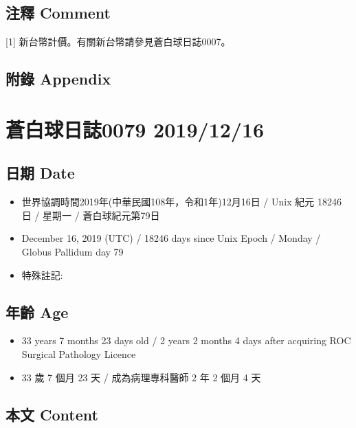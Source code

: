 \documentclass[
]{article}
\providecommand{\tightlist}{%
  \setlength{\itemsep}{0pt}\setlength{\parskip}{0pt}}
\begin{document}
\hypertarget{ux6ce8ux91cb-comment-13}{%
\subsection{注釋 Comment}\label{ux6ce8ux91cb-comment-13}}

{[}1{]} 新台幣計價。有關新台幣請參見蒼白球日誌0007。

\hypertarget{ux9644ux9304-appendix-14}{%
\subsection{附錄 Appendix}\label{ux9644ux9304-appendix-14}}

\hypertarget{ux84bcux767dux7403ux65e5ux8a8c0079-20191216}{%
\section{蒼白球日誌0079
2019/12/16}\label{ux84bcux767dux7403ux65e5ux8a8c0079-20191216}}

\hypertarget{ux65e5ux671f-date-15}{%
\subsection{日期 Date}\label{ux65e5ux671f-date-15}}

\begin{itemize}
\tightlist
\item
  世界協調時間2019年(中華民國108年，令和1年)12月16日 / Unix 紀元 18246
  日 / 星期一 / 蒼白球紀元第79日
\item
  December 16, 2019 (UTC) / 18246 days since Unix Epoch / Monday /
  Globus Pallidum day 79
\item
  特殊註記:
\end{itemize}

\hypertarget{ux5e74ux9f61-age-15}{%
\subsection{年齡 Age}\label{ux5e74ux9f61-age-15}}

\begin{itemize}
\tightlist
\item
  33 years 7 months 23 days old / 2 years 2 months 4 days after
  acquiring ROC Surgical Pathology Licence
\item
  33 歲 7 個月 23 天 / 成為病理專科醫師 2 年 2 個月 4 天
\end{itemize}

\hypertarget{ux672cux6587-content-15}{%
\subsection{本文 Content}\label{ux672cux6587-content-15}}
\end{document}
